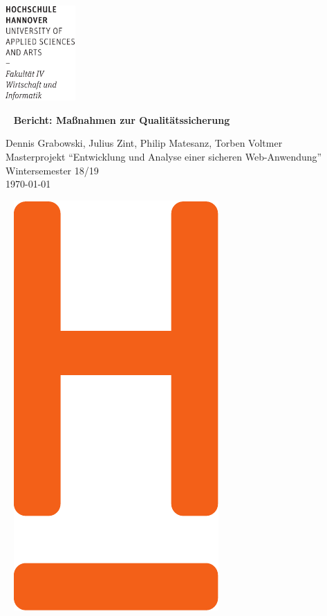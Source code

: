 \documentclass[12pt,DIV14,BCOR10mm,a4paper,twoside,parskip=half-,headsepline,headinclude,english,ngerman,bibliography=totocnumbered]{scrreprt}
\begin{document}
  \thispagestyle{empty} %
\includegraphics[width=0.2\textwidth]{Wortmarke_WI_schwarz}

   {  ~ \sffamily
  \vfill
  {\Huge\bfseries Bericht: Maßnahmen zur Qualitätssicherung}
  \bigskip

  {\Large
  Dennis Grabowski, Julius Zint, Philip Matesanz, Torben Voltmer \\[2ex]
  Masterprojekt \enquote{Entwicklung und Analyse einer sicheren Web-Anwendung} \\
  Wintersemester 18/19
 \\[5ex]
   \today }
}
 \vfill

  ~ \hfill
  \includegraphics[height=0.3\paperheight]{H_WI_Pantone1665}

\vspace*{-3cm}

\tableofcontents  %

\printbibliography

\printacronyms[title=Abkürzungsverzeichnis,toctitle=Abkürzungsverzeichnis]
\printglossary[type=main]

\listoffigures      %

\end{document}
